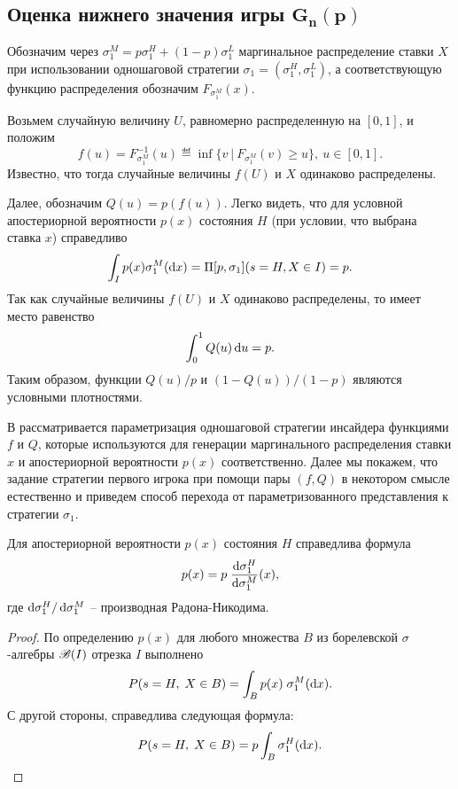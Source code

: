 {\subsection{Оценка нижнего значения игры $\mathbf{ G_{n}(p) }$}
\label{ch3:sec:-primal-game}

Обозначим через $\sigma^M_1 = p \sigma^H_1 + (1-p) \sigma^L_1$ маргинальное распределение ставки $X$ при использовании одношаговой стратегии $\sigma_1 = (\sigma^H_1, \sigma^L_1)$, а соответствующую функцию распределения обозначим $F_{\sigma^M_1}(x)$.

Возьмем случайную величину $U$, равномерно распределенную на $[0, 1]$, и положим
\begin{equation*}
  f(u) = F^{-1}_{\sigma^M_1}(u)
  \eqdef \inf \{ v\ |\ F_{\sigma^M_1}(v) \geq u \},\ u \in [0, 1].
\end{equation*}
Известно, что тогда случайные величины $f(U)$ и $X$ одинаково распределены.

Далее, обозначим $Q(u) = p(f(u))$.
Легко видеть, что для условной апостериорной вероятности $p(x)$ состояния $H$ (при условии, что выбрана ставка $x$) справедливо
\begin{equation*}
  \int_I p(x) \sigma^M_1(\mathop{}\!\mathrm{d} x) = \Pi[p, \sigma_1](s = H, X \in I) = p.
\end{equation*}
Так как случайные величины $f(U)$ и $X$ одинаково распределены, то имеет место равенство
\begin{equation*}
  \int_0^1 Q(u) \mathop{}\!\mathrm{d} u = p.
\end{equation*}
Таким образом, функции $Q(u)/p$ и $(1-Q(u))/(1-p)$ являются условными плотностями.

В \cite{demeyer02} рассматривается параметризация одношаговой стратегии инсайдера функциями $f$ и $Q$, которые используются для генерации маргинального распределения ставки $x$ и апостериорной вероятности $p(x)$ соответственно.
Далее мы покажем, что задание стратегии первого игрока при помощи пары $(f, Q)$ в некотором смысле естественно и приведем способ перехода от параметризованного представления к стратегии $\sigma_1$.

\begin{proposition}
  Для апостериорной вероятности $p(x)$ состояния $H$ справедлива формула
  \begin{equation}\label{ch3:eq:p(x)}
    p(x) = p \; \frac{\mathop{}\!\mathrm{d} \sigma^H_1}{\mathop{}\!\mathrm{d} \sigma^M_1}(x),
  \end{equation}
  где $\mathop{}\!\mathrm{d} \sigma^H_1/\mathop{}\!\mathrm{d} \sigma^M_1$ -- производная Радона-Никодима.
\end{proposition}
\begin{proof}
  По определению $p(x)$ для любого множества $B$ из борелевской $\sigma$-алгебры $\mathscr{B}(I)$ отрезка $I$ выполнено
  \begin{equation*}
    P(s = H, \; X \in B) = \int_B p(x) \; \sigma^M_1(\mathop{}\!\mathrm{d} x).
  \end{equation*}
  С другой стороны, справедлива следующая формула:
  \begin{equation*}
    P(s = H, \; X \in B) = p \int_B \sigma^H_1(\mathop{}\!\mathrm{d} x).
  \end{equation*}


\end{proof}}
